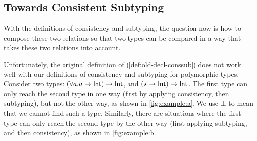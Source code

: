 \subsection{Towards Consistent Subtyping}
\label{subsec:towards-conssub}

With the definitions of consistency and subtyping, the question now is how to
compose these two relations so that two types can be compared in a way that takes
these two relations into account.

Unfortunately, the original definition of \citeauthor{siek2007gradual}
(\cref{def:old-decl-conssub}) does not work well with our definitions of
consistency and subtyping for polymorphic types. Consider two types: $(\forall
a. a \to \mathsf{Int}) \to \mathsf{Int}$, and $(\star \to \mathsf{Int}) \to \mathsf{Int}$. The first type can only reach the
second type in one way (first by applying consistency, then subtyping), but not the
other way, as shown in \cref{fig:example:a}. We use $\bot$ to mean that we
cannot find such a type. Similarly, there are situations where the first type
can only reach the second type by the other way (first applying
subtyping, and then
consistency), as shown in \cref{fig:example:b}.


